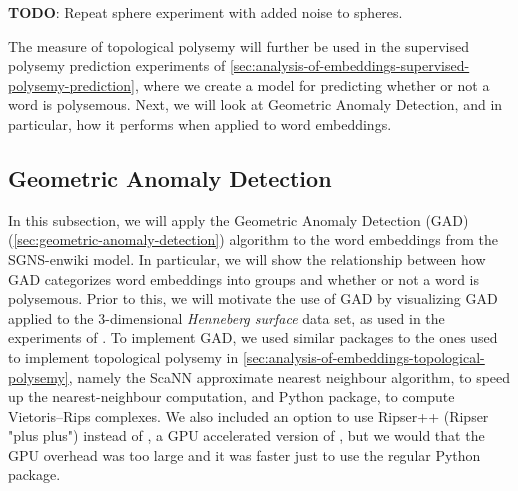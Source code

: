 \textbf{TODO}: Repeat sphere experiment with added noise to spheres.

The measure of topological polysemy will further be used in the supervised polysemy prediction experiments of \cref{sec:analysis-of-embeddings-supervised-polysemy-prediction}, where we create a model for predicting whether or not a word is polysemous. Next, we will look at Geometric Anomaly Detection, and in particular, how it performs when applied to word embeddings.

\subsection{Geometric Anomaly Detection}
\label{sec:analysis-of-embeddings-geometric-anomaly-detection}
In this subsection, we will apply the Geometric Anomaly Detection (GAD) (\cref{sec:geometric-anomaly-detection}) algorithm to the word embeddings from the SGNS-enwiki model. In particular, we will show the relationship between how GAD categorizes word embeddings into groups and whether or not a word is polysemous. Prior to this, we will motivate the use of GAD by visualizing GAD applied to the 3-dimensional \textit{Henneberg surface} data set, as used in the experiments of \cite{stolz2020geometric}. To implement GAD, we used similar packages to the ones used to implement topological polysemy in \cref{sec:analysis-of-embeddings-topological-polysemy}, namely the ScaNN \cite{scann2020} approximate nearest neighbour algorithm, to speed up the nearest-neighbour computation, and  \cite{ctralie2018ripser} Python package, to compute Vietoris–Rips complexes. We also included an option to use Ripser++ \cite{zhang2020ripserplusplus} (Ripser "plus plus") instead of , a GPU accelerated version of , but we would that the GPU overhead was too large and it was faster just to use the regular  Python package. 

